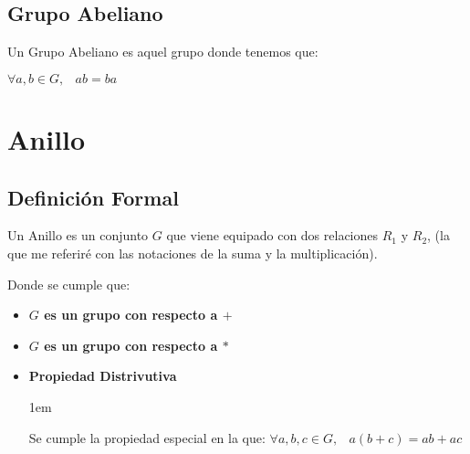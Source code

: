\documentclass[12pt]{report}                                    %
\newenvironment{SmallIndentation}[1][0.75em]                    %
    {\begin{adjustwidth}{#1}{}\begin{footnotesize}}                 %
    {\end{footnotesize}\end{adjustwidth}}                           %
\DeclareMathOperator \Space {\quad}                             %
\DeclareMathOperator \MiniSpace {\;}                            %
\begin{document}
        \subsection{Grupo Abeliano}

            Un Grupo Abeliano es aquel grupo donde tenemos que:

            $\forall a, b \in G, \MiniSpace ab = ba$



    \clearpage
    \section{Anillo}

        \subsection*{Definición Formal}

            Un Anillo es un conjunto $G$ que viene equipado con dos relaciones
            $R_1$ y $R_2$, (la que me referiré con las notaciones de la suma
            y la multiplicación).

            Donde se cumple que:

            \begin{itemize}
                \item \textbf{$G$ es un grupo con respecto a $+$}

                \item \textbf{$G$ es un grupo con respecto a $*$}

                \item
                    \textbf{Propiedad Distrivutiva}
                    
                    \begin{SmallIndentation}[1em]
                        Se cumple la propiedad especial en la que:
                        $\forall a, b, c \in G, \MiniSpace a(b+c)= ab +ac$
                    \end{SmallIndentation}

            \end{itemize}









       
\end{document}
